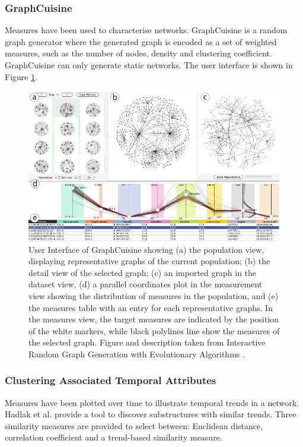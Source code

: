 \subsubsection*{GraphCuisine}
Measures have been used to characterise networks. GraphCuisine \cite{gcuisine} is a random graph generator where the generated graph is encoded as a set of weighted measures, such as the number of nodes, density and clustering coefficient. GraphCuisine can only generate static networks. The user interface is shown in Figure \ref{fig:graphCuisineInUse}.


\begin{figure}[H]
  \begin{center}
  \includegraphics[trim={0 0 0 0}, width=140mm]{./Figures/graphCuisineInUse.png}
  \caption{
    User Interface of GraphCuisine showing (a) the population view, displaying representative graphs of the current population; (b) the detail  view of the selected graph; (c) an imported graph in the dataset view, (d) a parallel coordinates plot in the measurement view showing the distribution of measures in the population, and (e) the measures table with an entry for each representative graphs. In the measures view, the target measures are indicated by the position of the white markers, while black polylines line show the measures of the selected graph.\newline
    Figure and description taken from Interactive Random Graph Generation with Evolutionary Algorithms \cite{gcuisine}. 
    }
  \label{fig:graphCuisineInUse}
  \end{center}
\end{figure}

\subsubsection*{Clustering Associated Temporal Attributes}
Measures have been plotted over time to illustrate temporal trends in a network. Hadlak et al. \cite{dynamicTrend} provide a tool to discover substructures with similar trends. Three similarity measures are provided to select between: Euclidean distance, correlation coefficient and a trend-based similarity measure.

